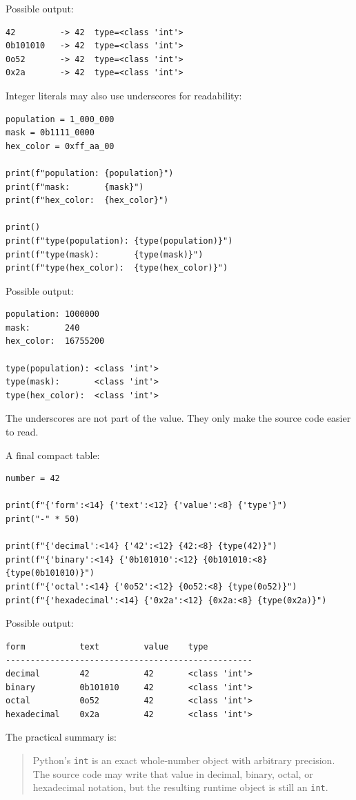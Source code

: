 Possible output:

\begin{verbatim}
42         -> 42  type=<class 'int'>
0b101010   -> 42  type=<class 'int'>
0o52       -> 42  type=<class 'int'>
0x2a       -> 42  type=<class 'int'>
\end{verbatim}

Integer literals may also use underscores for readability:

\begin{verbatim}
population = 1_000_000
mask = 0b1111_0000
hex_color = 0xff_aa_00

print(f"population: {population}")
print(f"mask:       {mask}")
print(f"hex_color:  {hex_color}")

print()
print(f"type(population): {type(population)}")
print(f"type(mask):       {type(mask)}")
print(f"type(hex_color):  {type(hex_color)}")
\end{verbatim}

Possible output:

\begin{verbatim}
population: 1000000
mask:       240
hex_color:  16755200

type(population): <class 'int'>
type(mask):       <class 'int'>
type(hex_color):  <class 'int'>
\end{verbatim}

The underscores are not part of the value. They only make the source code easier to read.

A final compact table:

\begin{verbatim}
number = 42

print(f"{'form':<14} {'text':<12} {'value':<8} {'type'}")
print("-" * 50)

print(f"{'decimal':<14} {'42':<12} {42:<8} {type(42)}")
print(f"{'binary':<14} {'0b101010':<12} {0b101010:<8} {type(0b101010)}")
print(f"{'octal':<14} {'0o52':<12} {0o52:<8} {type(0o52)}")
print(f"{'hexadecimal':<14} {'0x2a':<12} {0x2a:<8} {type(0x2a)}")
\end{verbatim}

Possible output:

\begin{verbatim}
form           text         value    type
--------------------------------------------------
decimal        42           42       <class 'int'>
binary         0b101010     42       <class 'int'>
octal          0o52         42       <class 'int'>
hexadecimal    0x2a         42       <class 'int'>
\end{verbatim}

The practical summary is:

\begin{quote}
Python's \texttt{int} is an exact whole-number object with arbitrary precision. The source code may write that value in decimal, binary, octal, or hexadecimal notation, but the resulting runtime object is still an \texttt{int}.
\end{quote}